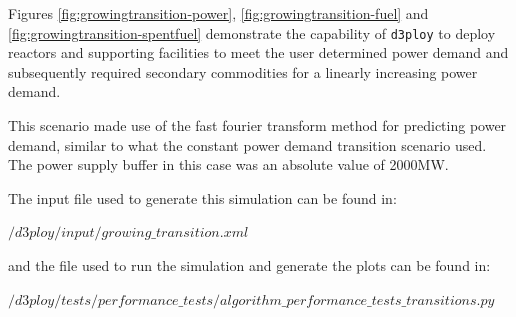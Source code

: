 \documentclass[11pt,letterpaper]{article}
\newcommand{\deploy}{\texttt{d3ploy}\xspace}%
\begin{document}
Figures \ref{fig:growingtransition-power}, \ref{fig:growingtransition-fuel}
and \ref{fig:growingtransition-spentfuel} demonstrate the capability 
of \deploy to deploy reactors and supporting facilities to meet the user 
determined power demand and subsequently required secondary commodities 
for a linearly increasing power demand. 

This scenario made use of the fast fourier transform method for predicting power
demand, similar to what the constant power demand transition scenario used.
The power supply buffer in this case was an absolute value of 2000MW. 

The input file used to generate this simulation can be found in:

\noindent
$/d3ploy/input/growing\_transition.xml$

\noindent
and the file used to run the simulation and generate the plots can be found in:

\noindent
$/d3ploy/tests/performance\_tests/algorithm\_performance\_tests\_transitions.py$
\end{document}
